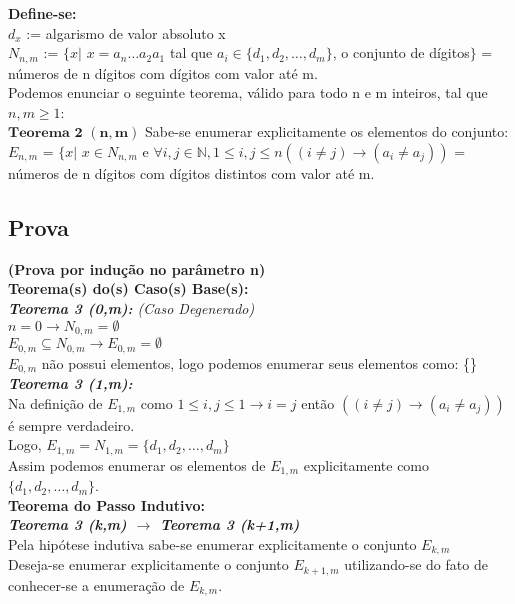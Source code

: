 \documentclass[twoside]{article}
\begin{document}
\begin{multicols}{2}
\textbf{Define-se:}\\
$d_x$ := algarismo de valor absoluto x\\
$N_{n,m}$ := $\{ x | $ $x=a_n \dots a_2a_1$ tal que $a_i \in \{d_1,d_2, \dots ,d_m\}$, o conjunto de dígitos$\}$ = números de n dígitos com dígitos com valor até m.\\

Podemos enunciar o seguinte teorema, válido para todo n e m inteiros, tal que $n,m\geq1$:\\

$\mathbf{Teorema}$ $\mathbf{2}$ $\mathbf{(n,m)}$ Sabe-se enumerar explicitamente os elementos do conjunto:\\
$E_{n,m}$ = $\{ x | $ $x \in N_{n,m}$ e $\forall i,j \in \mathbb{N}, 1 \leq i,j \leq n ((i \neq j) \rightarrow ( a_i \neq a_j ))$ = números de n dígitos com dígitos distintos com valor até m.

\subsection{ Prova }
\indent \textbf{(Prova por indução no parâmetro n)}\\

\textbf{Teorema(s) do(s) Caso(s) Base(s):}\\

\textit{\textbf{Teorema 3 (0,m):} (Caso Degenerado)}\\
$n=0 \rightarrow N_{0,m} = \emptyset$\\
$E_{0,m} \subseteq N_{0,m} \rightarrow E_{0,m} = \emptyset $\\
$E_{0,m}$ não possui elementos, logo podemos enumerar seus elementos como: \{\}\\

\textit{\textbf{Teorema 3 (1,m):}}\\
Na definição de $E_{1,m}$ como $1 \leq i,j \leq 1 \rightarrow i=j$ então $((i \neq j) \rightarrow ( a_i \neq a_j ))$ é sempre verdadeiro.\\
Logo,  $E_{1,m} = N_{1,m} = \{d_1,d_2,\dots,d_m\}$\\
Assim podemos enumerar os elementos de  $E_{1,m}$ explicitamente como $\{d_1,d_2,\dots,d_m\}$.\\

\textbf{Teorema do Passo Indutivo:}\\

\textit{\textbf{Teorema 3 (k,m) $\rightarrow$ Teorema 3 (k+1,m)}}\\
Pela hipótese indutiva sabe-se enumerar explicitamente o conjunto $E_{k,m}$ \\
Deseja-se enumerar explicitamente o conjunto  $E_{k+1,m}$ utilizando-se do fato de conhecer-se a enumeração de  $E_{k,m}$.\\


\end{multicols}
\end{document}
